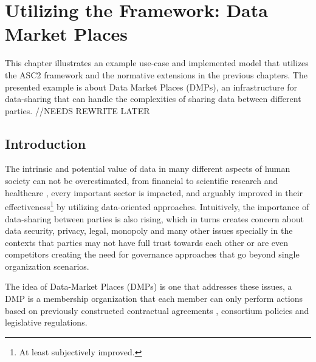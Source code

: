 \chapter{Utilizing the Framework: Data Market Places}
\label{ch:cmf}

This chapter illustrates an example use-case and implemented model that utilizes the ASC2 framework and the normative extensions in the previous chapters. The presented example is about Data Market Places (DMPs), an infrastructure for data-sharing that can handle the complexities of sharing data between different parties. //NEEDS REWRITE LATER

\section{Introduction}
The intrinsic and potential value of data in many different aspects of human society can not be overestimated, from financial \cite{Hasan2020} to scientific research \cite{Yuri2013} and healthcare \cite{Shilo2020}, every important sector is impacted, and arguably improved in their effectiveness\footnote{At least subjectively improved.} by utilizing data-oriented approaches. Intuitively, the importance of data-sharing between parties is also rising, which in turns creates concern about data security, privacy, legal, monopoly and many other issues specially in the contexts that parties may not have full trust towards each other or are even competitors \cite{clifton2004privacy} creating the need for governance approaches that go beyond single organization scenarios. 

The idea of Data-Market Places (DMPs) is one that addresses these issues, a DMP is a membership organization that each member can only perform actions based on previously constructed contractual agreements \cite{Zhang2019ModelingPlaces,Shakeri2019}, consortium policies and legislative regulations. 